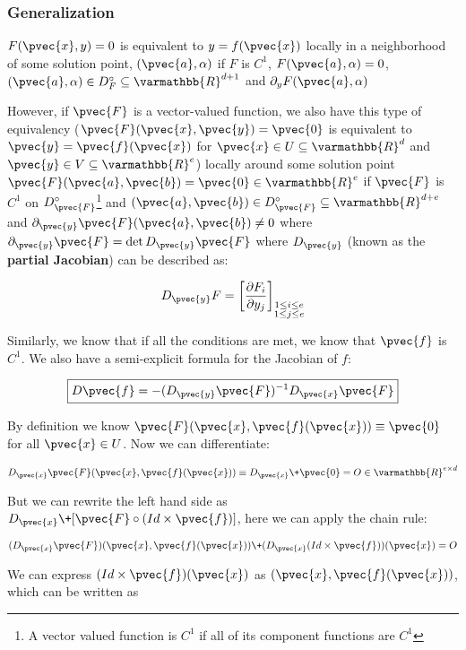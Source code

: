 \documentclass[11 pt, twoside]{article}
\begin{document}
\subsubsection{Generalization}

$F(\pvec{x}, y) = 0$ is equivalent to $y = f(\pvec{x})$ locally in a neighborhood
of some solution point, $(\pvec{a}, \alpha)$ if $F$ is $C^1$, $F(\pvec{a}, \alpha) = 0$,
$(\pvec{a}, \alpha) \in D_F^\circ \subseteq \varmathbb{R}^{d + 1}$ and
$\partial_y F(\pvec{a}, \alpha)$

However, if $\pvec{F}$ is a vector-valued function, we also have this type of
equivalency ($\pvec{F}(\pvec{x}, \pvec{y}) = \pvec{0}$ is equivalent to $\pvec{y} =
\pvec{f}(\pvec{x})$ for $\pvec{x} \in U \subseteq \varmathbb{R}^d$ and $\pvec{y} \in
V \subseteq \varmathbb{R}^e$) locally around some solution point $\pvec{F}(\pvec{a}, \pvec{b})
= \pvec{0} \in \varmathbb{R}^e$ if $\pvec{F}$ is $C^1$ on $D_{\pvec{F}}^\circ$\footnote{A vector valued
function is $C^1$ if all of its component functions are $C^1$} and $(\pvec{a},
\pvec{b}) \in D_{\pvec{F}}^\circ \subseteq \varmathbb{R}^{d + e}$ and
$\partial_{\pvec{y}} \pvec{F}(\pvec{a}, \pvec{b}) \neq 0$ where $\partial_{\pvec{y}}
\pvec{F} = \det D_{\pvec{y}} \pvec{F}$ where $D_{\pvec{y}}$ (known as the
\textbf{partial Jacobian}) can be described as:

$$D_{\pvec{y}} F = \left[\frac{\partial F_i}{\partial y_j}\right]_{\substack{1 \leq i \leq
e \\ 1 \leq j \leq e}}$$

Similarly, we know that if all the conditions are met, we know that $\pvec{f}$ is
$C^1$. We also have a semi-explicit formula for the Jacobian of $f$:

$$\boxed{D\pvec{f} = -(D_{\pvec{y}} \pvec{F})^{-1} D_{\pvec{x}} \pvec{F}}$$

By
definition we know $\pvec{F}(\pvec{x}, \pvec{f}(\pvec{x})) \equiv \pvec{0}$ for all
$\pvec{x} \in U$. Now we can differentiate:

$$D_{\pvec{x}} \pvec{F}(\pvec{x}, \pvec{f}(\pvec{x})) \equiv D_{\pvec{x}} \+ \pvec{0} = O
\in \varmathbb{R}^{e \times d}$$

But we can rewrite the left hand side as $D_{\pvec{x}} \+ [\pvec{F} \circ (Id
\times \pvec{f})]$, here we can apply the chain rule:

$$(D_{\pvec{x}} \pvec{F})(\pvec{x}, \pvec{f}(\pvec{x})) \+ (D_{\pvec{x}}(Id \times
\pvec{f})) (\pvec{x}) = O$$

We can express $(Id \times \pvec{f})(\pvec{x})$ as $(\pvec{x}, \pvec{f}(\pvec{x}))$,
which can be written as
\end{document}
